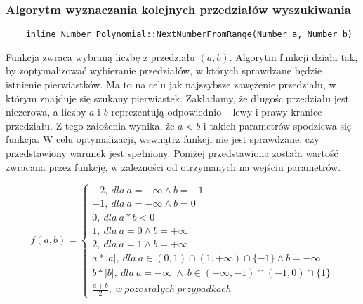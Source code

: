 \documentclass[oneside,a4paper]{book}
\begin{document}
	\subsubsection{Algorytm wyznaczania kolejnych przedziałów wyszukiwania}
	\begin{lstlisting}
	inline Number Polynomial::NextNumberFromRange(Number a, Number b)
	\end{lstlisting}
	
	Funkcja zwraca wybraną liczbę z przedziału $(a,b)$. Algorytm funkcji działa tak, by zoptymalizować wybieranie przedziałów, w których sprawdzane będzie istnienie pierwiastków. Ma to na celu jak najszybsze zawężenie przedziału, w którym znajduje się szukany pierwiastek. Zakładamy, że długośc przedziału jest niezerowa, a liczby $a$ i $b$ reprezentują odpowiednio -- lewy i prawy kraniec przedziału. Z tego założenia wynika, że $a<b$ i takich parametrów spodziewa się funkcja. W celu optymalizacji, wewnątrz funkcji nie jest sprawdzane, czy przedstawiony warunek jest spełniony. Poniżej przedstawiona została wartość zwracana przez funkcję, w zależności od otrzymanych na wejściu parametrów.
	
	\[
	f(a,b)=\left\{
	\begin{array}{ll}
	-2,\ dla\ a=-\infty \wedge b=-1\\
	-1,\ dla\ a=-\infty \wedge b=0\\
	0,\ dla\ a*b<0\\
	1,\ dla\ a=0 \wedge b=+\infty\\
	2,\ dla\ a=1 \wedge b=+\infty\\
	a*|a|,\ dla\ a \in (0,1) \cap (1,+\infty) \cap \{-1\} \wedge b=-\infty\ \\
	b*|b|,\ dla\ a=-\infty\ \wedge \ b \in (-\infty,-1) \cap (-1,0) \cap \{1\}\\
	\frac{a+b}{2},\ w\ pozostałych\ przypadkach
	\end{array}
	\right.
	\]
	
\end{document}
